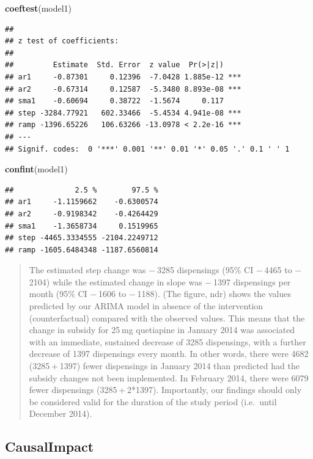 \documentclass[
]{article}
\newenvironment{Shaded}{\begin{snugshade}}{\end{snugshade}}
\newcommand{\KeywordTok}[1]{\textcolor[rgb]{0.13,0.29,0.53}{\textbf{#1}}}
\newcommand{\NormalTok}[1]{#1}
\begin{document}
\begin{Shaded}
\begin{Highlighting}[]
\KeywordTok{coeftest}\NormalTok{(model1)}
\end{Highlighting}
\end{Shaded}

\begin{verbatim}
## 
## z test of coefficients:
## 
##         Estimate  Std. Error  z value  Pr(>|z|)    
## ar1     -0.87301     0.12396  -7.0428 1.885e-12 ***
## ar2     -0.67314     0.12587  -5.3480 8.893e-08 ***
## sma1    -0.60694     0.38722  -1.5674     0.117    
## step -3284.77921   602.33466  -5.4534 4.941e-08 ***
## ramp -1396.65226   106.63266 -13.0978 < 2.2e-16 ***
## ---
## Signif. codes:  0 '***' 0.001 '**' 0.01 '*' 0.05 '.' 0.1 ' ' 1
\end{verbatim}

\begin{Shaded}
\begin{Highlighting}[]
\KeywordTok{confint}\NormalTok{(model1)}
\end{Highlighting}
\end{Shaded}

\begin{verbatim}
##              2.5 %        97.5 %
## ar1     -1.1159662    -0.6300574
## ar2     -0.9198342    -0.4264429
## sma1    -1.3658734     0.1519965
## step -4465.3334555 -2104.2249712
## ramp -1605.6484348 -1187.6560814
\end{verbatim}

\begin{quote}
The estimated step change was − 3285 dispensings (95\% CI − 4465 to − 2104) while the estimated change in slope was − 1397 dispensings per month (95\% CI − 1606 to − 1188). (The figure, ndr) shows the values predicted by our ARIMA model in absence of the intervention (counterfactual) compared with the observed values. This means that the change in subsidy for 25 mg quetiapine in January 2014 was associated with an immediate, sustained decrease of 3285 dispensings, with a further decrease of 1397 dispensings every month. In other words, there were 4682 (3285 + 1397) fewer dispensings in January 2014 than predicted had the subsidy changes not been implemented. In February 2014, there were 6079 fewer dispensings (3285 + 2*1397). Importantly, our findings should only be considered valid for the duration of the study period (i.e.~until December 2014).
\end{quote}

\hypertarget{causalimpact}{%
\subsection{CausalImpact}\label{causalimpact}}
\end{document}

